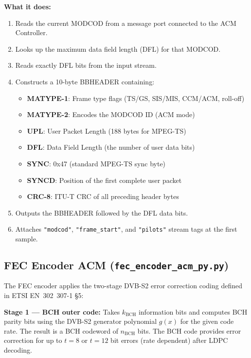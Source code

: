 \documentclass[12pt,a4paper]{report}
\begin{document}
\textbf{What it does:}
\begin{enumerate}
    \item Reads the current MODCOD from a message port connected to the ACM
          Controller.
    \item Looks up the maximum data field length (DFL) for that MODCOD.
    \item Reads exactly DFL bits from the input stream.
    \item Constructs a 10-byte BBHEADER containing:
          \begin{itemize}[nosep]
              \item \textbf{MATYPE-1}: Frame type flags (TS/GS, SIS/MIS, CCM/ACM, roll-off)
              \item \textbf{MATYPE-2}: Encodes the MODCOD ID (ACM mode)
              \item \textbf{UPL}: User Packet Length (188 bytes for MPEG-TS)
              \item \textbf{DFL}: Data Field Length (the number of user data bits)
              \item \textbf{SYNC}: 0x47 (standard MPEG-TS sync byte)
              \item \textbf{SYNCD}: Position of the first complete user packet
              \item \textbf{CRC-8}: ITU-T CRC of all preceding header bytes
          \end{itemize}
    \item Outputs the BBHEADER followed by the DFL data bits.
    \item Attaches \texttt{"modcod"}, \texttt{"frame\_start"}, and
          \texttt{"pilots"} stream tags at the first sample.
\end{enumerate}

\subsection{FEC Encoder ACM (\texttt{fec\_encoder\_acm\_py.py})}

The FEC encoder applies the two-stage DVB-S2 error correction coding defined
in ETSI EN~302~307-1 \S5:

\textbf{Stage 1 --- BCH outer code:} Takes $k_\text{BCH}$ information bits and
computes BCH parity bits using the DVB-S2 generator polynomial $g(x)$ for the
given code rate. The result is a BCH codeword of $n_\text{BCH}$ bits. The BCH
code provides error correction for up to $t = 8$ or $t = 12$ bit errors (rate
dependent) after LDPC decoding.
\end{document}
